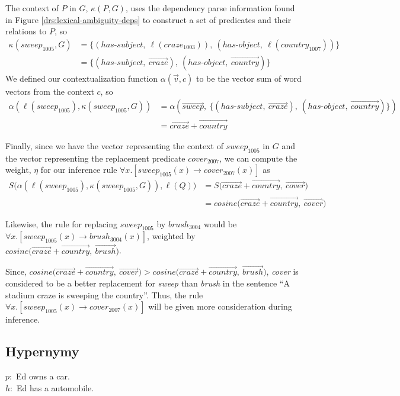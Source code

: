 The context of $P$ in $G$, $\kappa(P,G)$, uses the dependency parse information
found in Figure \ref{drs:lexical-ambiguity-deps} to construct a set of
predicates and their relations to $P$, so
\begin{align*}
\kappa(sweep_{1005}, G)
&= \{ (has\text{-}subject,~\ell(craze_{1003})),~ (has\text{-}object,~\ell(country_{1007})) \} \\ 
&= \{ (has\text{-}subject,~\vec{craze}),~ (has\text{-}object,~\vec{country}) \}
\end{align*}
We defined our contextualization function $\alpha(\vec v, c)$ to be the vector
sum of word vectors from the context $c$, so
\begin{align*}
\alpha(\ell(sweep_{1005}), \kappa(sweep_{1005}, G))
&= \alpha(\vec{sweep},~ \{ (has\text{-}subject,~\vec{craze}),~ (has\text{-}object,~\vec{country}) \}) \\
&= \vec{craze} + \vec{country}
\end{align*}

Finally, since we have the vector representing the context of $sweep_{1005}$ in
$G$ and the vector representing the replacement predicate $cover_{2007}$, we can
compute the weight, $\eta$ for our inference rule $\forall x.[sweep_{1005}(x)
\to cover_{2007}(x)]$ as
\begin{align*}
S\big(\alpha(\ell(sweep_{1005}), \kappa(sweep_{1005}, G)), \ell(Q)\big)
&= S\big(\vec{craze} + \vec{country},~ \vec{cover}\big) \\
&= cosine\big(\vec{craze} + \vec{country},~ \vec{cover}\big)
\end{align*}

Likewise, the rule for replacing $sweep_{1005}$ by $brush_{3004}$ would be 
$\forall x.[sweep_{1005}(x) \to brush_{3004}(x)]$, weighted by 
$cosine\big(\vec{craze} + \vec{country},~ \vec{brush}\big)$.

Since, $cosine\big(\vec{craze} + \vec{country},~ \vec{cover}\big) > 
cosine\big(\vec{craze} + \vec{country},~ \vec{brush}\big)$, {\it cover} is
considered to be a better replacement for {\it sweep} than {\it brush} in the
sentence ``A stadium craze is sweeping the country''.  Thus, the rule 
$\forall x.[sweep_{1005}(x) \to cover_{2007}(x)]$ will be given more
consideration during inference.


\subsection*{Hypernymy}

\begin{example}\label{ex:hyp-0}
$p:$ Ed owns a car. \\
$h:$ Ed has a automobile.
\end{example}

